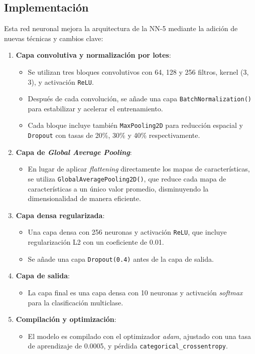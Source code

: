 \subsection{Implementación}

Esta red neuronal mejora la arquitectura de la NN-5 mediante la adición de nuevas técnicas y cambios clave:

\begin{enumerate}
	\item \textbf{Capa convolutiva y normalización por lotes}:
	\begin{itemize}
		\item Se utilizan tres bloques convolutivos con 64, 128 y 256 filtros, kernel (3, 3), y activación \texttt{ReLU}.
		\item Después de cada convolución, se añade una capa \texttt{BatchNormalization()} para estabilizar y acelerar el entrenamiento.
		\item Cada bloque incluye también \texttt{MaxPooling2D} para reducción espacial y \texttt{Dropout} con tasas de 20\%, 30\% y 40\% respectivamente.
	\end{itemize}
	
	\item \textbf{Capa de \textit{Global Average Pooling}}:
	\begin{itemize}
		\item En lugar de aplicar \textit{flattening} directamente los mapas de características, se utiliza \texttt{GlobalAveragePooling2D()}, que reduce cada mapa de características a un único valor promedio, disminuyendo la dimensionalidad de manera eficiente.
	\end{itemize}
	
	\item \textbf{Capa densa regularizada}:
	\begin{itemize}
		\item Una capa densa con 256 neuronas y activación \texttt{ReLU}, que incluye regularización L2 con un coeficiente de 0.01.
		\item Se añade una capa \texttt{Dropout(0.4)} antes de la capa de salida.
	\end{itemize}
	
	\item \textbf{Capa de salida}:
	\begin{itemize}
		\item La capa final es una capa densa con 10 neuronas y activación \textit{softmax} para la clasificación multiclase.
	\end{itemize}
	
	\item \textbf{Compilación y optimización}:
	\begin{itemize}
		\item El modelo es compilado con el optimizador \textit{adam}, ajustado con una tasa de aprendizaje de 0.0005, y pérdida \texttt{categorical\_crossentropy}.
	\end{itemize}
\end{enumerate}

